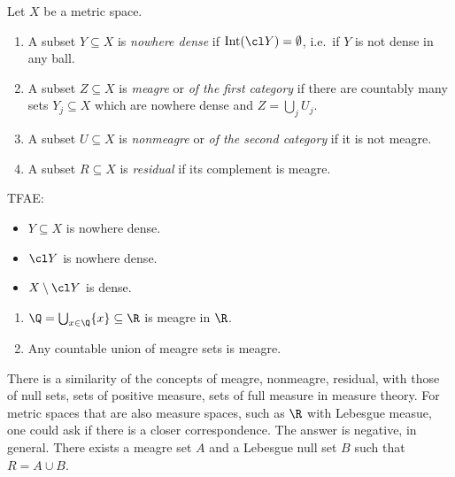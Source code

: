 \documentclass[a4paper]{article}
\begin{document}
\begin{definition}
  Let \(X\) be a metric space.
  \begin{enumerate}
  \item A subset \(Y \subseteq X\) is \emph{nowhere dense} if \(\operatorname{Int}(\cl Y) = \emptyset\), i.e.\ if \(Y\) is not dense in any ball.
  \item A subset \(Z \subseteq X\) is \emph{meagre} or \emph{of the first category} if there are countably many sets \(Y_j \subseteq X\) which are nowhere dense and \(Z = \bigcup_j U_j\).
  \item A subset \(U \subseteq X\) is \emph{nonmeagre} or \emph{of the second category} if it is not meagre.
  \item A subset \(R \subseteq X\) is \emph{residual} if its complement is meagre.
  \end{enumerate}
\end{definition}

\begin{remark}
  TFAE:
  \begin{itemize}
  \item \(Y \subseteq X\) is nowhere dense.
  \item \(\cl Y\) is nowhere dense.
  \item \(X \setminus \cl Y\) is dense.
  \end{itemize}
\end{remark}

\begin{eg}\leavevmode
  \begin{enumerate}
  \item \(\Q = \bigcup_{x \in \Q} \{x\} \subseteq \R\) is meagre in \(\R\).
  \item Any countable union of meagre sets is meagre.
  \end{enumerate}
\end{eg}

\begin{remark}
  There is a similarity of the concepts of meagre, nonmeagre, residual, with those of null sets, sets of positive measure, sets of full measure in measure theory. For metric spaces that are also measure spaces, such as \(\R\) with Lebesgue measue, one could ask if there is a closer correspondence. The answer is negative, in general. There exists a meagre set \(A\) and a Lebesgue null set \(B\) such that \(R = A \cup B\).
\end{remark}
\end{document}
